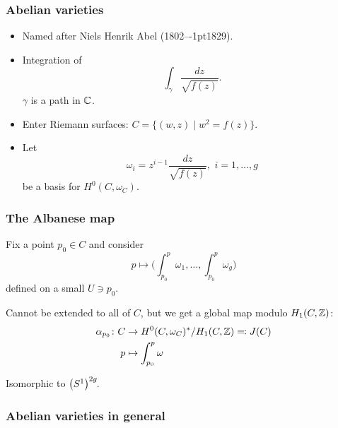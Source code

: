 \begin{frame}
\frametitle{Abelian varieties}

\begin{itemize}
	\item Named after Niels Henrik Abel (1802--\kern-1pt1829).
	\item Integration of
	\[
	\int_\gamma \frac{dz}{\sqrt{f(z)}}.
	\]
	$\gamma$ is a path in $\mathbb{C}$.
	\pause
	\item Enter Riemann surfaces: $C=\big\{ (w,z) \mid w^2=f(z) \big\}$.
	\pause
	\item Let 
	\[
	\omega_i = z^{i-1} \frac{dz}{\sqrt{f(z)}}, \, \, i=1,\ldots,g
	\]
	be a basis for $H^0(C,\omega_C)$.
\end{itemize}

\end{frame}


\begin{frame}
\frametitle{The Albanese map}

Fix a point $p_0 \in C$ and consider
\[
p \mapsto \Bigg(
\int_{p_0}^p \omega_1, \ldots,  \int_{p_0}^p \omega_g
\Bigg)
\]
defined on a small $U \ni p_0$.
\pause

Cannot be extended to all of $C$, but we get a global map modulo $H_1(C,\mathbb{Z})$:
\begin{align*}
\alpha_{p_0}\colon C &\to H^0(C,\omega_C)^\ast/ H_1(C,\mathbb{Z}) \eqqcolon J(C) \\
p &\mapsto \int_{p_0}^p \omega
\end{align*}

Isomorphic to $\big(S^1\big)^{2g}\mkern-3mu$.
\end{frame}

\begin{frame}
\frametitle{Abelian varieties in general}


\end{frame}

